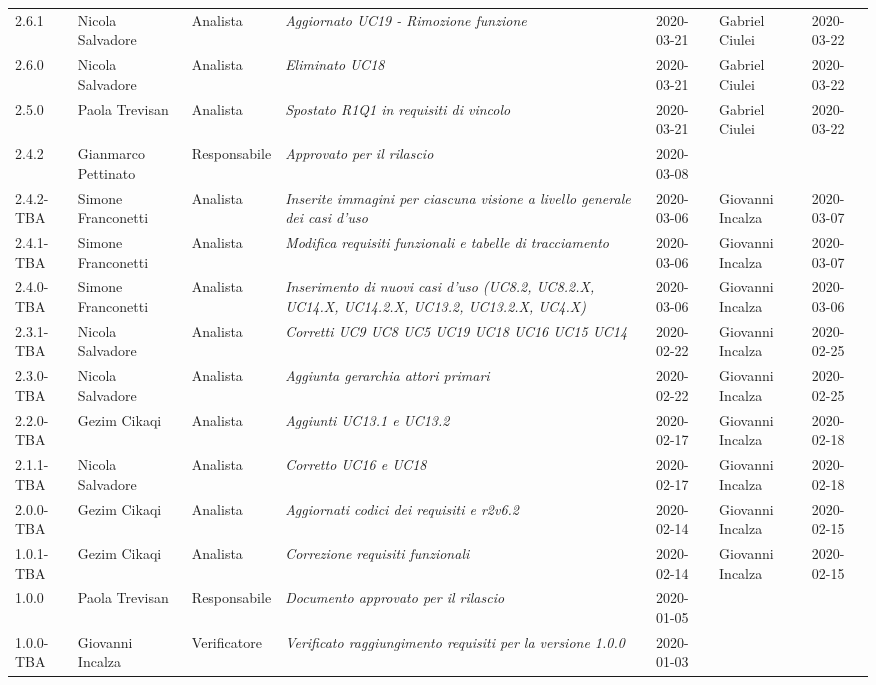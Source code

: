 \begin{longtable}{|p{1.7cm}|p{2cm}|p{2.5cm}|p{3cm}|p{1.7cm}|p{2cm}|p{2.3cm}|}
    2.6.1& Nicola Salvadore & Analista & \small{\textit{Aggiornato UC19 - Rimozione funzione}} & 2020-03-21 & Gabriel Ciulei & 2020-03-22\\
    2.6.0& Nicola Salvadore & Analista & \small{\textit{Eliminato UC18}} & 2020-03-21 & Gabriel Ciulei & 2020-03-22\\
    2.5.0& Paola Trevisan& Analista & \small{\textit{Spostato R1Q1 in requisiti di vincolo}} & 2020-03-21 & Gabriel Ciulei & 2020-03-22\\
    2.4.2 & Gianmarco Pettinato & Responsabile & \small{\textit{Approvato per il rilascio}} & 2020-03-08 & &\\
    2.4.2-TBA & Simone Franconetti & Analista & \small{\textit{Inserite immagini per ciascuna visione a livello generale dei casi d'uso}} & 2020-03-06 & Giovanni Incalza & 2020-03-07 \\
    2.4.1-TBA & Simone Franconetti & Analista & \small{\textit{Modifica requisiti funzionali e tabelle di tracciamento}} & 2020-03-06 & Giovanni Incalza & 2020-03-07 \\
    2.4.0-TBA & Simone Franconetti & Analista & \small{\textit{Inserimento di nuovi casi d'uso (UC8.2, UC8.2.X, UC14.X, UC14.2.X, UC13.2, UC13.2.X, UC4.X)}} & 2020-03-06 & Giovanni Incalza & 2020-03-06 \\
    2.3.1-TBA & Nicola Salvadore & Analista & \small{\textit{Corretti UC9 UC8 UC5 UC19 UC18 UC16 UC15 UC14}} & 2020-02-22 & Giovanni Incalza & 2020-02-25 \\
    2.3.0-TBA & Nicola Salvadore & Analista & \small{\textit{Aggiunta gerarchia attori primari}} & 2020-02-22 & Giovanni Incalza & 2020-02-25 \\
    2.2.0-TBA & Gezim Cikaqi & Analista & \small{\textit{Aggiunti UC13.1 e UC13.2}} & 2020-02-17 & Giovanni Incalza & 2020-02-18 \\
    2.1.1-TBA & Nicola Salvadore & Analista & \small{\textit{Corretto UC16 e UC18}} & 2020-02-17 & Giovanni Incalza & 2020-02-18 \\
    2.0.0-TBA & Gezim Cikaqi & Analista & \small{\textit{Aggiornati codici dei requisiti e r2v6.2}} & 2020-02-14 & Giovanni Incalza & 2020-02-15 \\
    1.0.1-TBA & Gezim Cikaqi & Analista & \small{\textit{Correzione requisiti funzionali}} & 2020-02-14 & Giovanni Incalza & 2020-02-15 \\
    1.0.0 & Paola Trevisan & Responsabile & \small{\textit{Documento approvato per il rilascio}} & 2020-01-05 & & \\
    1.0.0-TBA & Giovanni Incalza & Verificatore & \small{\textit{Verificato raggiungimento requisiti per la versione 1.0.0}} & 2020-01-03 & & \\

\end{longtable}

